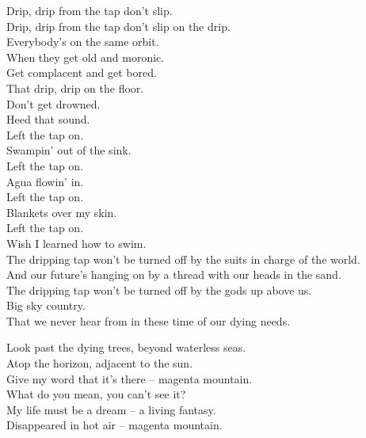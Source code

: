 Drip, drip from the tap don't slip. \\
Drip, drip from the tap don't slip on the drip. \\

Everybody's on the same orbit. \\
When they get old and moronic. \\
Get complacent and get bored. \\
That drip, drip on the floor. \\

Don't get drowned. \\
Heed that sound. \\

Left the tap on. \\
Swampin' out of the sink. \\
Left the tap on. \\
Agua flowin' in. \\
Left the tap on. \\
Blankets over my skin. \\
Left the tap on. \\
Wish I learned how to swim. \\

The dripping tap won't be turned off by the suits in charge of the world. \\
And our future's hanging on by a thread with our heads in the sand. \\
The dripping tap won't be turned off by the gods up above us. \\
Big sky country. \\
That we never hear from in these time of our dying needs. \\




Look past the dying trees, beyond waterless seas. \\
Atop the horizon, adjacent to the sun. \\
Give my word that it's there -- magenta mountain. \\

What do you mean, you can't see it? \\
My life must be a dream -- a living fantasy. \\
Disappeared in hot air -- magenta mountain. \\

